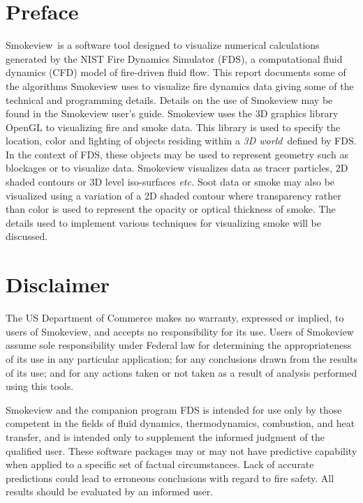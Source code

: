 \documentclass[11pt,twoside]{book}
\newcommand{\fds}{{FDS}}
\newcommand{\Smokeview}{{Smokeview}}
\begin{document}
\chapter{Preface}
\Smokeview\ is a software tool designed to visualize numerical
calculations generated by the NIST Fire Dynamics Simulator (\fds),
a computational fluid dynamics (CFD) model of fire-driven fluid
flow. This report documents some of the algorithms Smokeview uses to visualize fire dynamics data giving some of the technical and programming details.
Details on the use of Smokeview may be found in the Smokeview user's
guide.
Smokeview uses the 3D graphics library OpenGL to visualizing fire and smoke data.
This library is
used to specify the location, color and
lighting of objects residing within a {\em 3D world}\ defined by FDS.
In the context of FDS, these objects
may be used to represent geometry such as blockages or to
visualize data. Smokeview visualizes data as tracer particles, 2D
shaded contours or 3D level iso-surfaces {\em etc.}  Soot data or
smoke may also be visualized using a variation of a 2D shaded
contour where transparency rather than color is used to represent
the opacity or optical thickness of smoke.  The details used to implement various
techniques for visualizing smoke will be discussed.



\chapter{Disclaimer}

The US Department of Commerce makes no warranty,
expressed or implied, to users of Smokeview, and accepts no
responsibility for its use. Users of Smokeview assume sole
responsibility under Federal law for determining the
appropriateness of its use in any particular application; for any
conclusions drawn from the results of its use; and for any actions
taken or not taken as a result of analysis performed using this
tools.

Smokeview and the companion program FDS is intended for use only
by those competent in the fields of fluid dynamics,
thermodynamics, combustion, and heat transfer, and is intended
only to supplement the informed judgment of the qualified user.
These software packages may or may not have predictive capability
when applied to a specific set of factual circumstances. Lack of
accurate predictions could lead to erroneous conclusions with
regard to fire safety. All results should be evaluated by an
informed user.
\end{document}
